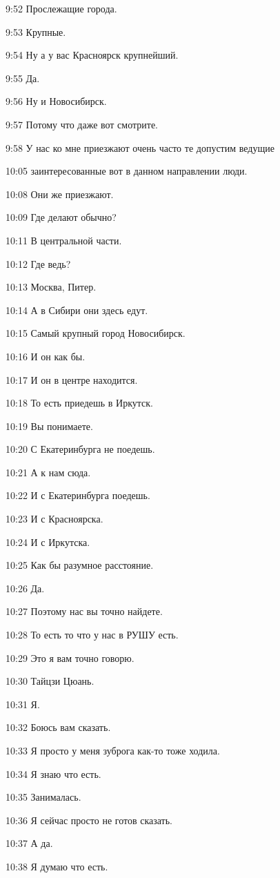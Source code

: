 9:52
Прослежащие города.

9:53
Крупные.

9:54
Ну а у вас Красноярск крупнейший.

9:55
Да.

9:56
Ну и Новосибирск.

9:57
Потому что даже вот смотрите.

9:58
У нас ко мне приезжают очень часто те допустим ведущие

10:05
заинтересованные вот в данном направлении люди.

10:08
Они же приезжают.

10:09
Где делают обычно?

10:11
В центральной части.

10:12
Где ведь?

10:13
Москва, Питер.

10:14
А в Сибири они здесь едут.

10:15
Самый крупный город Новосибирск.

10:16
И он как бы.

10:17
И он в центре находится.

10:18
То есть приедешь в Иркутск.

10:19
Вы понимаете.

10:20
С Екатеринбурга не поедешь.

10:21
А к нам сюда.

10:22
И с Екатеринбурга поедешь.

10:23
И с Красноярска.

10:24
И с Иркутска.

10:25
Как бы разумное расстояние.

10:26
Да.

10:27
Поэтому нас вы точно найдете.

10:28
То есть то что у нас в РУШУ есть.

10:29
Это я вам точно говорю.

10:30
Тайцзи Цюань.

10:31
Я.

10:32
Боюсь вам сказать.

10:33
Я просто у меня зуброга как-то тоже ходила.

10:34
Я знаю что есть.

10:35
Занималась.

10:36
Я сейчас просто не готов сказать.

10:37
А да.

10:38
Я думаю что есть.

